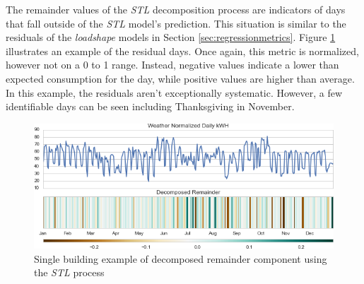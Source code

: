 The remainder values of the \emph{STL} decomposition process are indicators of days that fall outside of the \emph{STL} model's prediction. This situation is similar to the residuals of the \emph{loadshape} models in Section \ref{sec:regressionmetrics}. Figure \ref{fig:remainder_single} illustrates an example of the residual days. Once again, this metric is normalized, however not on a 0 to 1 range. Instead, negative values indicate a lower than expected consumption for the day, while positive values are higher than average. In this example, the residuals aren't exceptionally systematic. However, a few identifiable days can be seen including Thanksgiving in November.

\begin{figure}[ht!]
\begin{center}
\includegraphics[width=1\columnwidth]{figures/stl_weathernorm_remainder_example/stl_weathernorm_remainder_example}
\caption{Single building example of decomposed remainder component using the \emph{STL} process
\label{fig:remainder_single}%
}
\end{center}
\end{figure}


